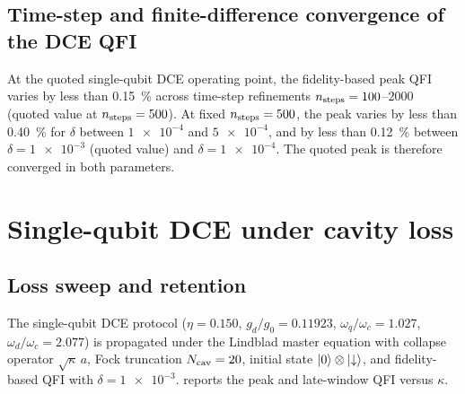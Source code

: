 \documentclass[aps,prxquantum,preprint,superscriptaddress,amsmath,amssymb]{revtex4-2}
\begin{document}
\subsection{Time-step and finite-difference convergence of the DCE QFI}

At the quoted single-qubit DCE operating point, the fidelity-based peak QFI varies by less than \qty{0.15}{\percent} across time-step refinements $n_{\rm steps}=\num{100}$--$\num{2000}$ (quoted value at $n_{\rm steps}=\num{500}$). At fixed $n_{\rm steps}=\num{500}$, the peak varies by less than \qty{0.40}{\percent} for $\delta$ between $\num{1e-4}$ and $\num{5e-4}$, and by less than \qty{0.12}{\percent} between $\delta=\num{1e-3}$ (quoted value) and $\delta=\num{1e-4}$. The quoted peak is therefore converged in both parameters.

\section{Single-qubit DCE under cavity loss}
\label{sec:si_loss_adjusted}

\subsection{Loss sweep and retention}

The single-qubit DCE protocol ($\eta=\num{0.150}$, $g_d/g_0=\num{0.11923}$, $\omega_q/\omega_c=\num{1.027}$, $\omega_d/\omega_c=\num{2.077}$) is propagated under the Lindblad master equation with collapse operator $\sqrt{\kappa}\,a$, Fock truncation $N_{\rm cav}=\num{20}$, initial state $\ket{0}\otimes\ket{\downarrow}$, and fidelity-based QFI with $\delta=\num{1e-3}$.  reports the peak and late-window QFI versus $\kappa$.
\end{document}
